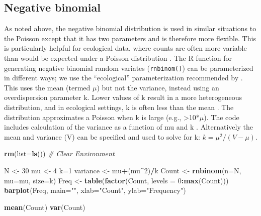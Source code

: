 \documentclass[
]{krantz}
\makeatletter
\newenvironment{Shaded}{\begin{snugshade}}{\end{snugshade}}
\newcommand{\AttributeTok}[1]{\textcolor[rgb]{0.27,0.27,0.27}{#1}}
\newcommand{\CommentTok}[1]{\textcolor[rgb]{0.37,0.37,0.37}{\textit{#1}}}
\newcommand{\DecValTok}[1]{\textcolor[rgb]{0.06,0.06,0.06}{#1}}
\newcommand{\FunctionTok}[1]{\textcolor[rgb]{0.27,0.27,0.27}{\textbf{#1}}}
\newcommand{\NormalTok}[1]{#1}
\newcommand{\OtherTok}[1]{\textcolor[rgb]{0.37,0.37,0.37}{#1}}
\newcommand{\SpecialCharTok}[1]{\textcolor[rgb]{0.43,0.43,0.43}{\textbf{#1}}}
\newcommand{\StringTok}[1]{\textcolor[rgb]{0.5,0.5,0.5}{#1}}
\newenvironment{kframe}{%
\medskip{}
\setlength{\fboxsep}{.8em}
 \def\at@end@of@kframe{}%
 \ifinner\ifhmode%
  \def\at@end@of@kframe{\end{minipage}}%
  \begin{minipage}{\columnwidth}%
 \fi\fi%
 \def\FrameCommand##1{\hskip\@totalleftmargin \hskip-\fboxsep
 \colorbox{shadecolor}{##1}\hskip-\fboxsep
     \hskip-\linewidth \hskip-\@totalleftmargin \hskip\columnwidth}%
 \MakeFramed {\advance\hsize-\width
   \@totalleftmargin\z@ \linewidth\hsize
   \@setminipage}}%
 {\par\unskip\endMakeFramed%
 \at@end@of@kframe}
\renewenvironment{Shaded}{\begin{kframe}}{\end{kframe}}
\makeatother
\begin{document}
\hypertarget{NegBinom}{%
\subsection{Negative binomial}\label{NegBinom}}

As noted above, the negative binomial distribution is used in similar situations to the Poisson except that it has two parameters and is therefore more flexible. This is particularly helpful for ecological data, where counts are often more variable than would be expected under a Poisson distribution \citep{bolker2008, link.barker_2010}. The R function for generating negative binomial random variates (\texttt{rnbinom()}) can be parameterized in different ways; we use the ``ecological'' parameterization recommended by \citet{bolker2008}. This uses the mean (termed \(\mu\)) but not the variance, instead using an overdispersion parameter k. Lower values of k result in a more heterogeneous distribution, and in ecological settings, k is often less than the mean \citep{bolker2008}. The distribution approximates a Poisson when k is large (e.g., \textgreater10*\(\mu\)). The code includes calculation of the variance as a function of mu and k \citep{bolker2008}. Alternatively the mean and variance (V) can be specified and used to solve for k: \(k = \mu^2/(V-\mu)\).

\begin{Shaded}
\begin{Highlighting}[]
\FunctionTok{rm}\NormalTok{(}\AttributeTok{list=}\FunctionTok{ls}\NormalTok{()) }\CommentTok{\# Clear Environment}

\NormalTok{N }\OtherTok{\textless{}{-}} \DecValTok{30}
\NormalTok{mu }\OtherTok{\textless{}{-}} \DecValTok{4}
\NormalTok{k}\OtherTok{=}\DecValTok{1}
\NormalTok{variance }\OtherTok{\textless{}{-}}\NormalTok{ mu}\SpecialCharTok{+}\NormalTok{(mu}\SpecialCharTok{\^{}}\DecValTok{2}\NormalTok{)}\SpecialCharTok{/}\NormalTok{k}
\NormalTok{Count }\OtherTok{\textless{}{-}} \FunctionTok{rnbinom}\NormalTok{(}\AttributeTok{n=}\NormalTok{N, }\AttributeTok{mu=}\NormalTok{mu, }\AttributeTok{size=}\NormalTok{k)}
\NormalTok{Freq }\OtherTok{\textless{}{-}} \FunctionTok{table}\NormalTok{(}\FunctionTok{factor}\NormalTok{(Count, }\AttributeTok{levels =} \DecValTok{0}\SpecialCharTok{:}\FunctionTok{max}\NormalTok{(Count)))}
\FunctionTok{barplot}\NormalTok{(Freq, }\AttributeTok{main=}\StringTok{""}\NormalTok{, }\AttributeTok{xlab=}\StringTok{"Count"}\NormalTok{, }\AttributeTok{ylab=}\StringTok{"Frequency"}\NormalTok{)}

\FunctionTok{mean}\NormalTok{(Count)}
\FunctionTok{var}\NormalTok{(Count)}
\end{Highlighting}
\end{Shaded}
\end{document}
